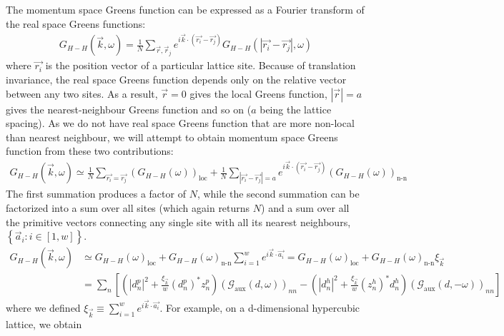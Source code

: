 \documentclass{report}
\numberwithin{equation}{section}
\begin{document}
The momentum space Greens function can be expressed as a Fourier transform of the real space Greens functions:
\begin{equation}\begin{aligned}
	G_{H-H} (\vec k, \omega) = \frac{1}{N}\sum_{\vec r, \vec r_j}e^{i \vec{k}\cdot\left(\vec{r_i} - \vec {r_j}\right)}G_{H-H} (|\vec{r_i} - \vec {r_j}|, \omega)
\end{aligned}\end{equation}
where $\vec{r_i}$ is the position vector of a particular lattice site. Because of translation invariance, the real space Greens function depends only on the relative vector between any two sites. As a result, $\vec r=0$ gives the local Greens function, $|\vec r|=a$ gives the nearest-neighbour Greens function and so on ($a$ being the lattice spacing). As we do not have real space Greens function that are more non-local than nearest neighbour, we will attempt to obtain momentum space Greens function from these two contributions:
\begin{equation}\begin{aligned}
	G_{H-H} (\vec k, \omega) \simeq \frac{1}{N}\sum_{\vec{r_i} = \vec {r_j}}\left(G_{H-H} (\omega)\right) _\text{loc} + \frac{1}{N}\sum_{|\vec{r_i} - \vec {r_j}|=a} e^{i \vec{k}\cdot\left(\vec{r_i} - \vec {r_j}\right)}\left(G_{H-H} (\omega)\right)_\text{n-n}
\end{aligned}\end{equation}
The first summation produces a factor of $N$, while the second summation can be factorized into a sum over all sites (which again returns $N$) and a sum over all the primitive vectors connecting any single site with all its nearest neighbours, $\left\{ \vec a_i: i \in \left[1, w\right]\right\}$.
\begin{equation}\begin{aligned}
	\label{k_Gf_siam}
	G_{H-H} (\vec k, \omega) &\simeq G_{H-H} (\omega)_\text{loc} + G_{H-H} (\omega)_\text{n-n}\sum_{i=1}^w e^{i \vec{k}\cdot\vec {a_i}} = G_{H-H} (\omega)_\text{loc} + G_{H-H} (\omega)_\text{n-n} \xi_{\vec k}\\
			     &= \sum_n\left[\left(|d^p_n|^2 + \frac{\xi_{\vec k}}{w}\left(d^p_n\right)^* z^p_n\right) \left(\mathcal{G}_\text{aux}(d, \omega)\right)_{nn} - \left(|d^h_n|^2 + \frac{\xi_{\vec k}}{w}\left(z^h_n\right)^* d^h_n\right) \left(\mathcal{G}_\text{aux}(d, -\omega)\right)_{nn}\right]
\end{aligned}\end{equation}
where we defined \(\xi_{\vec k} \equiv \sum_{i=1}^w e^{i \vec{k}\cdot\vec {a_i}}\). For example, on a d-dimensional hypercubic lattice, we obtain
\end{document}
